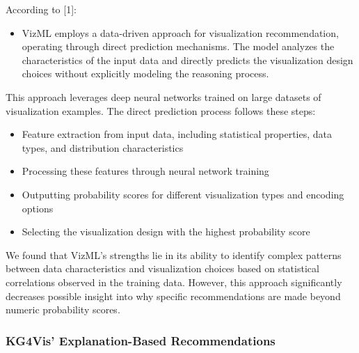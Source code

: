 According to [1]:
\begin{itemize}
\item VizML employs a data-driven approach for visualization recommendation, operating through direct prediction mechanisms. The model analyzes the characteristics of the input data and directly predicts the visualization design choices without explicitly modeling the reasoning process. \par 
\end{itemize}
This approach leverages deep neural networks trained on large datasets of visualization examples.
The direct prediction process follows these steps:
\begin{itemize}
\item Feature extraction from input data, including statistical properties, data types, and distribution characteristics
\item Processing these features through neural network training
\item Outputting probability scores for different visualization types and encoding options
\item Selecting the visualization design with the highest probability score
\end{itemize}
\medskip
We found that VizML's strengths lie in its ability to identify complex patterns between data characteristics and visualization choices based on statistical correlations observed in the training data. However, this approach significantly decreases possible insight into why specific recommendations are made beyond numeric probability scores.

\subsubsection{KG4Vis’ Explanation-Based Recommendations}

